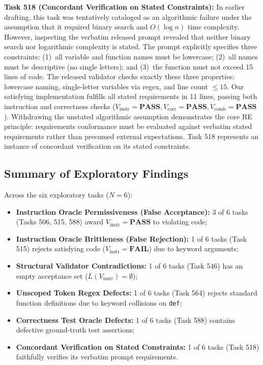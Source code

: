 \documentclass[runningheads]{llncs}
\begin{document}
\textbf{Task 518 (Concordant Verification on Stated Constraints):} In earlier drafting, this task was tentatively cataloged as an algorithmic failure under the assumption that it required binary search and $O(\log n)$ time complexity. However, inspecting the verbatim released prompt revealed that neither binary search nor logarithmic complexity is stated. The prompt explicitly specifies three constraints: (1)~all variable and function names must be lowercase; (2)~all names must be descriptive (no single letters); and (3)~the function must not exceed 15 lines of code. The released validator checks exactly these three properties: lowercase naming, single-letter variables via regex, and line count $\le 15$. Our satisfying implementation fulfills all stated requirements in 11 lines, passing both instruction and correctness checks ($V_{\text{instr}}=\textbf{PASS}, V_{\text{corr}}=\textbf{PASS}, V_{\text{comb}}=\textbf{PASS}$). Withdrawing the unstated algorithmic assumption demonstrates the core RE principle: requirements conformance must be evaluated against verbatim stated requirements rather than presumed external expectations. Task 518 represents an instance of concordant verification on its stated constraints.

\subsection{Summary of Exploratory Findings}
Across the six exploratory tasks ($N=6$):
\begin{itemize}[leftmargin=*]
    \item \textbf{Instruction Oracle Permissiveness (False Acceptance):} 3 of 6 tasks (Tasks 506, 515, 588) award $V_{\text{instr}}=\textbf{PASS}$ to violating code;
    \item \textbf{Instruction Oracle Brittleness (False Rejection):} 1 of 6 tasks (Task 515) rejects satisfying code ($V_{\text{instr}}=\textbf{FAIL}$) due to keyword arguments;
    \item \textbf{Structural Validator Contradictions:} 1 of 6 tasks (Task 546) has an empty acceptance set ($L(V_{\text{instr}})=\emptyset$);
    \item \textbf{Unscoped Token Regex Defects:} 1 of 6 tasks (Task 564) rejects standard function definitions due to keyword collisions on \texttt{def};
    \item \textbf{Correctness Test Oracle Defects:} 1 of 6 tasks (Task 588) contains defective ground-truth test assertions;
    \item \textbf{Concordant Verification on Stated Constraints:} 1 of 6 tasks (Task 518) faithfully verifies its verbatim prompt requirements.
\end{itemize}
\end{document}

